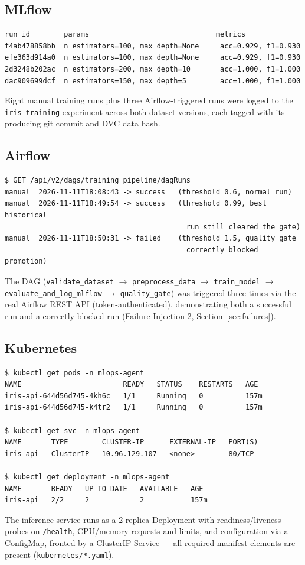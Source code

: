 \documentclass[11pt,a4paper]{article}
\begin{document}
\subsection{MLflow}
\begin{lstlisting}
run_id        params                              metrics
f4ab478858bb  n_estimators=100, max_depth=None     acc=0.929, f1=0.930
efe363d914a0  n_estimators=100, max_depth=None     acc=0.929, f1=0.930
2d3248b202ac  n_estimators=200, max_depth=10       acc=1.000, f1=1.000
dac909699dcf  n_estimators=150, max_depth=5        acc=1.000, f1=1.000
\end{lstlisting}
Eight manual training runs plus three Airflow-triggered runs were logged to
the \texttt{iris-training} experiment across both dataset versions, each
tagged with its producing git commit and DVC data hash.

\subsection{Airflow}
\begin{lstlisting}
$ GET /api/v2/dags/training_pipeline/dagRuns
manual__2026-11-11T18:08:43 -> success   (threshold 0.6, normal run)
manual__2026-11-11T18:49:54 -> success   (threshold 0.99, best historical
                                           run still cleared the gate)
manual__2026-11-11T18:50:31 -> failed    (threshold 1.5, quality gate
                                           correctly blocked promotion)
\end{lstlisting}
The DAG (\texttt{validate\_dataset} $\to$ \texttt{preprocess\_data} $\to$
\texttt{train\_model} $\to$ \texttt{evaluate\_and\_log\_mlflow} $\to$
\texttt{quality\_gate}) was triggered three times via the real Airflow REST
API (token-authenticated), demonstrating both a successful run and a
correctly-blocked run (Failure Injection 2, Section~\ref{sec:failures}).

\subsection{Kubernetes}
\begin{lstlisting}
$ kubectl get pods -n mlops-agent
NAME                        READY   STATUS    RESTARTS   AGE
iris-api-644d56d745-4kh6c   1/1     Running   0          157m
iris-api-644d56d745-k4tr2   1/1     Running   0          157m

$ kubectl get svc -n mlops-agent
NAME       TYPE        CLUSTER-IP      EXTERNAL-IP   PORT(S)
iris-api   ClusterIP   10.96.129.107   <none>        80/TCP

$ kubectl get deployment -n mlops-agent
NAME       READY   UP-TO-DATE   AVAILABLE   AGE
iris-api   2/2     2            2           157m
\end{lstlisting}
The inference service runs as a 2-replica Deployment with readiness/liveness
probes on \texttt{/health}, CPU/memory requests and limits, and
configuration via a ConfigMap, fronted by a ClusterIP Service --- all
required manifest elements are present (\texttt{kubernetes/*.yaml}).
\end{document}
